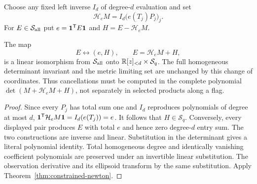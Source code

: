 Choose any fixed left inverse $I_d$ of degree-$d$ evaluation and set
\[
 \mathcal H_e M=I_d\bigl(e(T_j)P_j\bigr)_j.
\]
For $E\in\mathcal S_{\rm all}$ put
$e=\mathbf 1^{\mathsf T}E\mathbf 1$ and $H=E-\mathcal H_eM$.
\begin{proposition}
\label{prop:newton-gauge}
The map
\[
 E\longleftrightarrow(e,H),\qquad
 E=\mathcal H_eM+H,
\]
is a linear isomorphism from $\mathcal S_{\rm all}$ onto
$\mathbb R[z]_{<d}\times\mathcal S_q$. The full homogeneous determinant
invariant and the metric limiting set are unchanged by this change
of coordinates. Thus cancellations must be computed in the complete
polynomial $\det(M+\mathcal H_eM+H)$, not separately in selected
products along a flag.
\end{proposition}
\begin{proof}
Since every $P_j$ has total sum one and $I_d$ reproduces polynomials
of degree at most $d$,
$\mathbf 1^{\mathsf T}\mathcal H_eM\mathbf 1=I_d(e(T_j))=e$.
It follows that $H\in\mathcal S_q$. Conversely, every displayed
pair produces $E$ with total $e$ and hence zero degree-$d$ entry sum.
The two constructions are inverse and linear. Substitution in the
determinant gives a literal polynomial identity. Total homogeneous
degree and identically vanishing coefficient polynomials are preserved
under an invertible linear substitution. The observation derivative
and its ellipsoid transform by the same substitution. Apply
Theorem~\ref{thm:constrained-newton}.
\end{proof}

